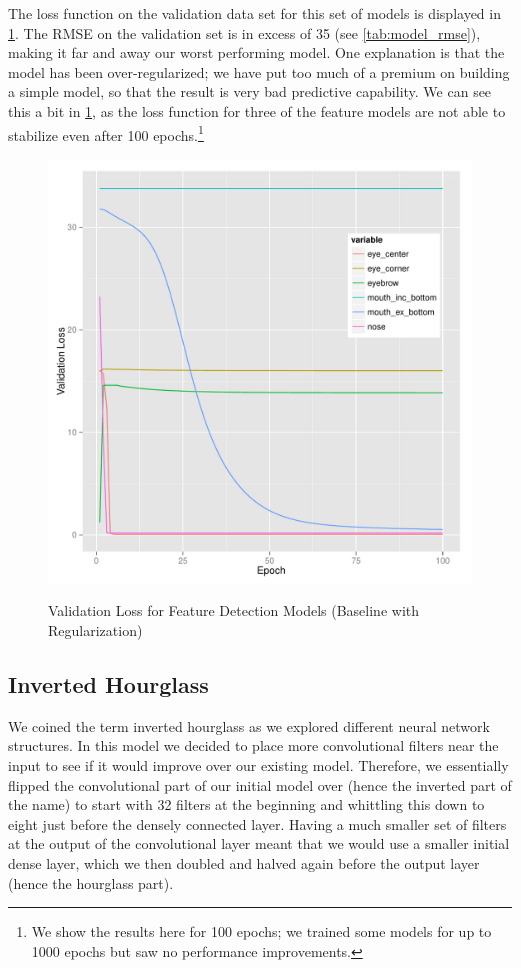 \documentclass[journal]{IEEEtran}
\begin{document}
The loss function on the validation data set for this set of models is displayed in \cref{fig:val_loss_default_w_l1_and_l2}. The RMSE on the validation set is in excess of 35 (see \cref{tab:model_rmse}), making it far and away our worst performing model. One explanation is that the model has been over-regularized; we have put too much of a premium on building a simple model, so that the result is very bad predictive capability. We can see this a bit in \cref{fig:val_loss_default_w_l1_and_l2}, as the loss function for three of the feature models are not able to stabilize even after 100 epochs.\footnote{We show the results here for 100 epochs; we trained some models for up to 1000 epochs but saw no performance improvements.}

\begin{figure}[!htb]
  \centering
  \caption{Validation Loss for Feature Detection Models (Baseline with Regularization)}
  \includegraphics[scale=.49]{val_loss_default_w_l1_and_l2.pdf}
  \label{fig:val_loss_default_w_l1_and_l2}
\end{figure}

\subsection{Inverted Hourglass}

We coined the term inverted hourglass as we explored different neural network structures.  In this model we decided to place more convolutional filters near the input to see if it would improve over our existing model.  Therefore, we essentially flipped the convolutional part of our initial model over (hence the inverted part of the name) to start with 32 filters at the beginning and whittling this down to eight just before the densely connected layer.  Having a much smaller set of filters at the output of the convolutional layer meant that we would use a smaller initial dense layer, which we then doubled and halved again before the output layer (hence the hourglass part).
\end{document}
